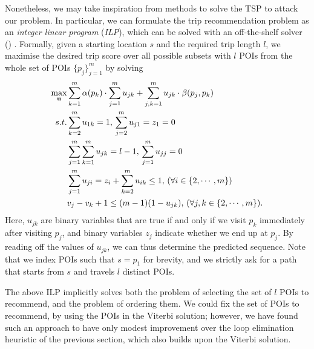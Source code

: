 Nonetheless, we may take inspiration from methods to solve the TSP to attack our problem.
In particular, 
we can formulate the trip recommendation problem as an \emph{integer linear program} (\emph{ILP}),
which can be solved with an off-the-shelf solver () \citep{opt98}.
Formally, given a starting location $s$ and the required trip length $l$,
we maximise the desired trip score over all possible subsets with $l$ POIs from the whole set of POIs $\{p_j\}_{j=1}^m$
by solving
\begin{align*}
\max_{\bu} & \sum_{k=1}^m \alpha( p_k ) \cdot \sum_{j=1}^m u_{jk} +
            \sum_{j,k=1}^m u_{jk} \cdot \beta( p_j, p_k ) \\
s.t. 
& \sum_{k=2}^m u_{1k} = 1, \, \sum_{j=2}^m u_{j1} = z_1=0  \\                %
& \sum_{j=1}^m \sum_{k=1}^m u_{jk} = l-1, \, \sum_{j=1}^m u_{jj}=0  \\      %
& \sum_{j=1}^m u_{ji} = z_i + \sum_{k=2}^m u_{ik} \le 1, \, (\forall i \in \{2,\cdots,m\})  \\ %
& v_j - v_k + 1 \le (m-1) (1-u_{jk}), \, (\forall j,k \in \{2,\cdots,m\}).                 %
\end{align*}
Here, $u_{jk}$ are binary variables that are true if and only if
we visit $p_k$ immediately after visiting $p_j$,
and binary variables $z_j$ indicate whether we end up at $p_j$.
By reading off the values of $u_{jk}$, we can thus determine the predicted sequence.
Note that we index POIs such that $s = p_1$ for brevity,
and we strictly ask for a path that starts from $s$ and travels $l$ distinct POIs.

The above ILP implicitly solves both the problem of selecting the set of $l$ POIs to recommend,
and the problem of ordering them.
We could fix the set of POIs to recommend, \eg by using the POIs in the Viterbi solution;
however, we have found such an approach to have only modest improvement over the loop elimination heuristic of the previous section, which also builds upon the Viterbi solution.
